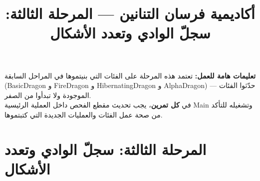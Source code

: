 \documentclass[14pt]{extarticle}
\title{أكاديمية فرسان التنانين — المرحلة الثالثة: سجلّ الوادي وتعدد الأشكال}
\begin{document}
\maketitle
\thispagestyle{fancy}

\begin{boxWarning}
\textbf{تعليمات هامة للعمل:}
تعتمد هذه المرحلة على الفئات التي بنيتموها في المراحل السابقة (\textenglish{BasicDragon} و \textenglish{FireDragon} و \textenglish{HibernatingDragon} و \textenglish{AlphaDragon}) — حدّثوا الفئات الموجودة ولا تبدأوا من الصفر. \\
في \textbf{كل تمرين}، يجب تحديث مقطع الفحص داخل العملية الرئيسية \textenglish{Main} وتشغيله للتأكد من صحة عمل الفئات والعمليات الجديدة التي كتبتموها.
\end{boxWarning}

\section*{المرحلة الثالثة: سجلّ الوادي وتعدد الأشكال}
\end{document}
